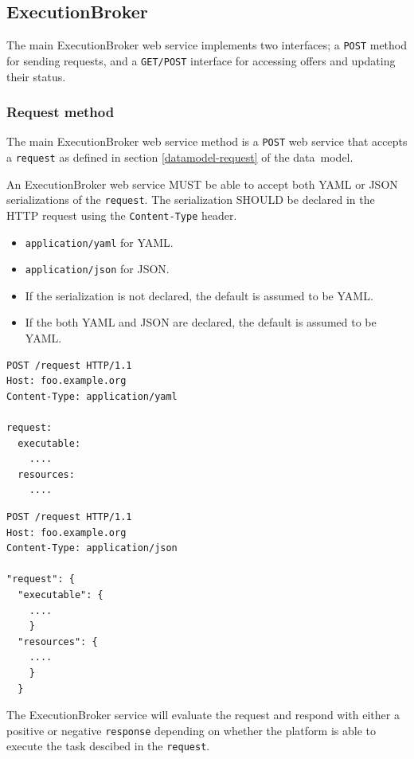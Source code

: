 \documentclass[11pt,a4paper]{ivoa}
\newcommand{\json} {JSON}
\newcommand{\yaml} {YAML}
\newcommand{\datamodel} {data~model}
\newcommand{\webservice} {web service}
\newcommand{\execbrokerclass} {ExecutionBroker}
\newcommand{\codeword}[1] {\texttt{#1}}
\begin{document}
\subsection{ExecutionBroker}
\label{execution-planner-spec}

The main \execbrokerclass{} \webservice{} implements two interfaces;
a \codeword{POST} method for sending requests, and a \codeword{GET/POST}
interface for accessing offers and updating their status.

\subsubsection{Request method}
\label{execution-planner-request}

The main \execbrokerclass{} \webservice{} method is a \codeword{POST} \webservice{} that accepts
a \codeword{request} as defined in section \ref{datamodel-request} of the \datamodel{}.

An \execbrokerclass{} \webservice{} MUST be able to accept both \yaml{} or \json{} serializations
of the \codeword{request}.
The serialization SHOULD be declared in the HTTP request using the \codeword{Content-Type} header.
\begin{itemize}
    \item \codeword{application/yaml} for \yaml{}.
    \item \codeword{application/json} for \json{}.
    \item If the serialization is not declared, the default is assumed to be \yaml{}.
    \item If the both \yaml{} and \json{} are declared, the default is assumed to be \yaml{}.
\end{itemize}

\begin{lstlisting}[]
POST /request HTTP/1.1
Host: foo.example.org
Content-Type: application/yaml

request:
  executable:
    ....
  resources:
    ....
\end{lstlisting}

\begin{lstlisting}[]
POST /request HTTP/1.1
Host: foo.example.org
Content-Type: application/json

"request": {
  "executable": {
    ....
    }
  "resources": {
    ....
    }
  }
\end{lstlisting}

The \execbrokerclass{} service will evaluate the request and respond with either a positive
or negative \codeword{response} depending on whether the platform is able to execute the
task descibed in the \codeword{request}.
\end{document}
